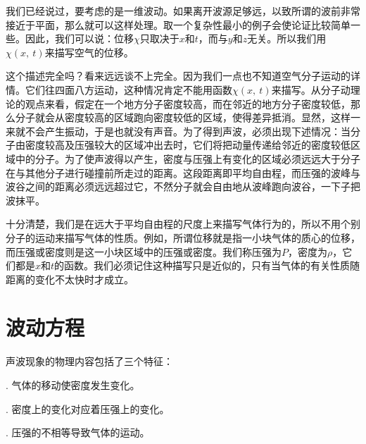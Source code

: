 我们已经说过，要考虑的是一维波动。如果离开波源足够远，以致所谓的波前非常接近于平面，那么就可以这样处理。取一个复杂性最小的例子会使论证比较简单一些。因此，我们可以说：位移$\chi$只取决于$x$和$t$，而与$y$和$z$无关。所以我们用$\chi(x,~t)$来描写空气的位移。

这个描述完全吗？看来远远谈不上完全。因为我们一点也不知道空气分子运动的详情。它们往四面八方运动，这种情况肯定不能用函数$\chi(x,~t)$来描写。从分子动理论的观点来看，假定在一个地方分子密度较高，而在邻近的地方分子密度较低，那么分子就会从密度较高的区域跑向密度较低的区域，使得差异抵消。显然，这样一来就不会产生振动，于是也就没有声音。为了得到声波，必须出现下述情况：当分子由密度较高及压强较大的区域冲出去时，它们将把动量传递给邻近的密度较低区域中的分子。为了使声波得以产生，密度与压强上有变化的区域必须远远大于分子在与其他分子进行碰撞前所走过的距离。这段距离即平均自由程，而压强的波峰与波谷之间的距离必须远远超过它，不然分子就会自由地从波峰跑向波谷，一下子把波抹平。

十分清楚，我们是在远大于平均自由程的尺度上来描写气体行为的，所以不用个别分子的运动来描写气体的性质。例如，所谓位移就是指一小块气体的质心的位移，而压强或密度则是这一小块区域中的压强或密度。我们称压强为$P$，密度为$\rho$，它们都是$x$和$t$的函数。我们必须记住这种描写只是近似的，只有当气体的有关性质随距离的变化不太快时才成立。

\section{波动方程}

声波现象的物理内容包括了三个特征：

\uppercase\expandafter{}. 气体的移动使密度发生变化。

\uppercase\expandafter{}. 密度上的变化对应着压强上的变化。

\uppercase\expandafter{}. 压强的不相等导致气体的运动。

